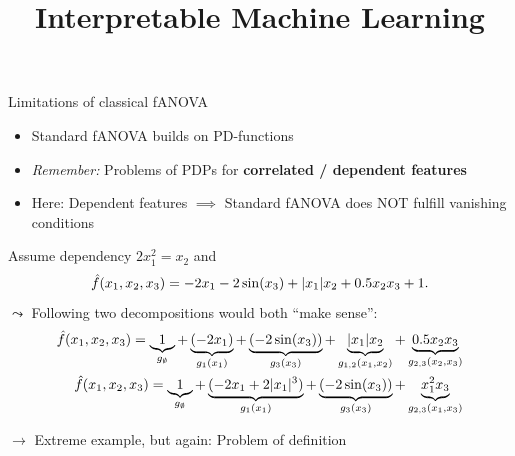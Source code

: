\documentclass[10pt,compress,t,notes=noshow, xcolor=table]{beamer}
\title{Interpretable Machine Learning}
\date{}
\begin{document}
 



\begin{frame}{Limitations of classical fANOVA}

    \begin{itemize}
    
        \item Standard fANOVA builds on PD-functions
        
        \item \textit{Remember:} Problems of PDPs for \textbf{correlated / dependent features}
        \item Here: Dependent features $\implies$ Standard fANOVA does NOT fulfill vanishing conditions %
    \end{itemize}
    \pause
    \begin{example}
        Assume dependency \(2x_1^2 = x_2\) and
        \begin{equation*}
            \hat{f}(x_1, x_2, x_3) = - 2x_1 - 2\sin(x_3) + |x_1|x_2 + 0.5 x_2 x_3 + 1.
        \end{equation*}
        $\leadsto$ Following two decompositions would both ``make sense'':
        \begin{align*}
            \hat{f}(x_1, x_2, x_3)
            = \underbrace{1}_{g_\emptyset}
                + \underbrace{(- 2x_1)}_{g_1(x_1)} 
                + \underbrace{(- 2\sin(x_3))}_{g_3(x_3)}
                + \underbrace{|x_1|x_2}_{g_{1,2}(x_1, x_2)} 
                + \underbrace{0.5 x_2 x_3}_{g_{2,3}(x_2, x_3)} \\
            \hat{f}(x_1, x_2, x_3)
            = \underbrace{1}_{g_\emptyset}
                + \underbrace{(- 2x_1 + 2 |x_1|^3)}_{g_1(x_1)} 
                + \underbrace{(- 2\sin(x_3))}_{g_3(x_3)}
                + \underbrace{x_1^2 x_3}_{g_{2,3}(x_1, x_3)}
        \end{align*}
    \end{example}
    \pause
    $\rightarrow$ Extreme example, but again: Problem of definition


\end{frame}
\end{document}
